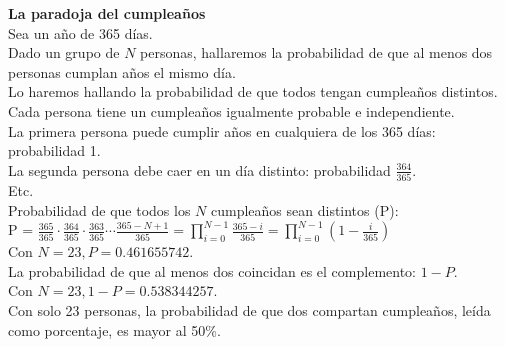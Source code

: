 \textbf{La paradoja del cumpleaños} \\
Sea un año de 365 días. \\
Dado un grupo de $N$ personas, hallaremos la probabilidad de que al menos dos personas cumplan años el mismo día. \\
Lo haremos hallando la probabilidad de que todos tengan cumpleaños distintos. \\
Cada persona tiene un cumpleaños igualmente probable e independiente. \\
La primera persona puede cumplir años en cualquiera de los 365 días: probabilidad 1. \\
La segunda persona debe caer en un día distinto:  probabilidad $\frac{364}{365}$. \\
Etc. \\
Probabilidad de que todos los $N$ cumpleaños sean distintos (P): \\
P = $\frac{365}{365} \cdot \frac{364}{365} \cdot \frac{363}{365} \cdots \frac{365-N+1}{365} = \prod_{i=0}^{N-1}\frac{365-i}{365} = \prod_{i=0}^{N-1}(1-\frac{i}{365})$ \\
Con $N=23, P=0.461655742$. \\
La probabilidad de que al menos dos coincidan es el complemento: $1-P$. \\
Con $N=23, 1-P=0.538344257$. \\
Con solo 23 personas, la probabilidad de que dos compartan cumpleaños, leída como porcentaje, es mayor al 50\%. \\

